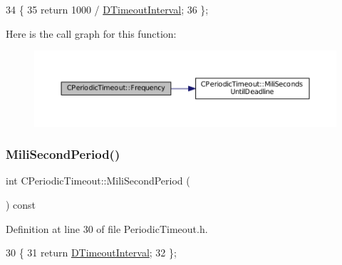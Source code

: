 \begin{DoxyCode}
34                              \{
35             \textcolor{keywordflow}{return} 1000 / \hyperlink{classCPeriodicTimeout_ab0c2b821c02366c9638a66eced3c1f34}{DTimeoutInterval};  
36         \};
\end{DoxyCode}
Here is the call graph for this function\+:\nopagebreak
\begin{figure}[H]
\begin{center}
\leavevmode
\includegraphics[width=350pt]{classCPeriodicTimeout_af5a198bf926337b0f4470d0b77bca542_cgraph}
\end{center}
\end{figure}
\hypertarget{classCPeriodicTimeout_ad5e27bd939d6452b0667d0c5ef74247e}{}\label{classCPeriodicTimeout_ad5e27bd939d6452b0667d0c5ef74247e} 
\subsubsection{\texorpdfstring{Mili\+Second\+Period()}{MiliSecondPeriod()}}
{\footnotesize\ttfamily int C\+Periodic\+Timeout\+::\+Mili\+Second\+Period (\begin{DoxyParamCaption}{ }\end{DoxyParamCaption}) const\hspace{0.3cm}{\ttfamily [inline]}}



Definition at line 30 of file Periodic\+Timeout.\+h.


\begin{DoxyCode}
30                                     \{
31             \textcolor{keywordflow}{return} \hyperlink{classCPeriodicTimeout_ab0c2b821c02366c9638a66eced3c1f34}{DTimeoutInterval}; 
32         \};
\end{DoxyCode}
\hypertarget{classCPeriodicTimeout_a5d32d0a29ba5efa718f3489cb9fb2340}{}\label{classCPeriodicTimeout_a5d32d0a29ba5efa718f3489cb9fb2340} 

